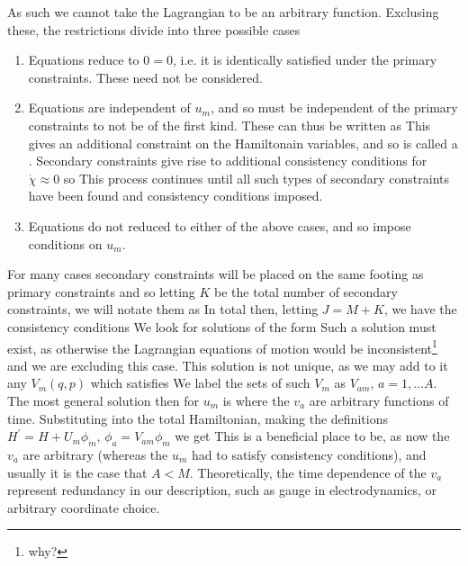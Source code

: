 \documentclass{article}
\begin{document}
As such we cannot take the Lagrangian to be an arbitrary function. Exclusing these, the restrictions divide into three possible cases 
\begin{enumerate}
    \item Equations reduce to $0=0$, i.e. it is identically satisfied under the primary constraints. These need not be considered.
    \item Equations are independent of $u_m$, and so must be independent of the primary constraints to not be of the first kind. These can thus be written as 
    This gives an additional constraint on the Hamiltonain variables, and so is called a . Secondary constraints give rise to additional consistency conditions for $\dot{\chi}\approx 0$ so
    This process continues until all such types of secondary constraints have been found and consistency conditions imposed. 
    \item Equations do not reduced to either of the above cases, and so impose conditions on $u_m$. 
\end{enumerate}
For many cases secondary constraints will be placed on the same footing as primary constraints and so letting $K$ be the total number of secondary constraints, we will notate them as 
In total then, letting $J=M+K$, we have the consistency conditions 
We look for solutions of the form 
Such a solution must exist, as otherwise the Lagrangian equations of motion would be inconsistent\footnote{why?} and we are excluding this case. This solution is not unique, as we may add to it any $V_m(q,p)$ which satisfies
We label the sets of such $V_m$ as $V_{am}, \, a=1, \dots A$. The most general solution then for $u_m$ is 
where the $v_a$ are arbitrary functions of time. Substituting into the total Hamiltonian, making the definitions $H^\prime = H + U_m \phi_m, \, \phi_a = V_{am}\phi_m$ we get 
This is a beneficial place to be, as now the $v_a$ are arbitrary (whereas the $u_m$ had to satisfy consistency conditions), and usually it is the case that $A < M$. Theoretically, the time dependence of the $v_a$ represent redundancy in our description, such as gauge in electrodynamics, or arbitrary coordinate choice. \\
\end{document}
